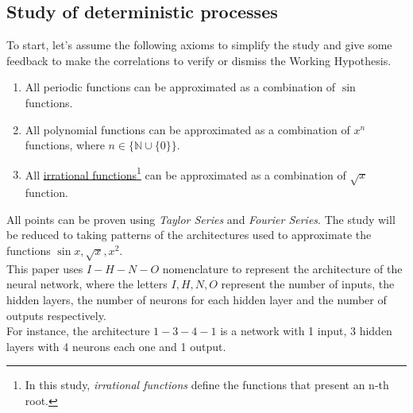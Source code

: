 \documentclass[a4paper, 11pt]{article}
\begin{document}
\subsection{Study of deterministic processes}
To start, let's assume the following axioms to simplify the study and give some feedback to make the correlations to verify or dismiss the Working Hypothesis.
\begin{enumerate}
    \item All periodic functions can be approximated as a combination of $\sin$ functions.
    \item All polynomial functions can be approximated as a combination of $x^n$ functions, where $n\in \{\mathbb{N} \cup \{0\}\}$.
    \item All \underline{irrational functions}\footnote{In this study, \textit{irrational functions} define the functions that present an n-th root.} can be approximated as a combination of $\sqrt{x}$ function.
\end{enumerate} 
All points can be proven using \textit{Taylor Series} and \textit{Fourier Series}.
The study will be reduced to taking patterns of the architectures used to approximate the functions $\sin{x}, \sqrt{x}, x^2$.\\
This paper uses $I-H-N-O$ nomenclature to represent the architecture of the neural network, where the letters $I,H,N,O$ represent the number of inputs, the hidden layers, the number of neurons for each hidden layer and the number of outputs respectively.\\
For instance, the architecture $1-3-4-1$ is a network with 1 input, 3 hidden layers with 4 neurons each one and 1 output.
\end{document}

